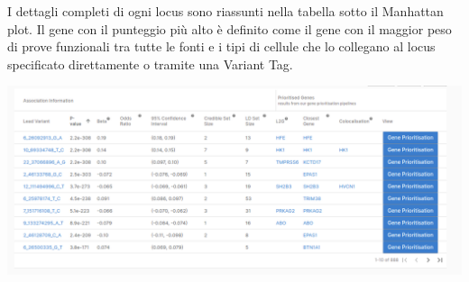 \documentclass{article}
\begin{document}
I dettagli completi di ogni locus sono riassunti nella tabella sotto il Manhattan plot. Il gene con il punteggio più alto è definito come il gene con il maggior peso di prove funzionali tra tutte le fonti e i tipi di cellule che lo collegano al locus specificato direttamente o tramite una Variant Tag. 
\begin{center}
    \includegraphics[width=1\textwidth]{figures/6-Study.png}
\end{center}
\end{document}
